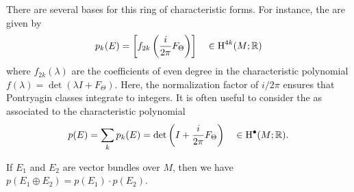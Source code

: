 There are several bases for this ring of characteristic forms. For instance, the  are given by
\[
  p_k(E) = \left[f_{2k}\left(\frac{i}{2\pi}F_\Theta\right)\right]\quad\in\operatorname{H}^{4k}(M; \mathbb{R})
\]
where $f_{2k}(\lambda)$ are the coefficients of even degree in the characteristic polynomial $f(\lambda) = \det(\lambda I+F_\Theta)$. Here, the normalization factor of $i/2\pi$ ensures that Pontryagin classes integrate to integers. It is often useful to consider the  as associated to the characteristic polynomial
\[
  p(E) = \sum_k p_k(E) = \det\left(I + \frac{i}{2\pi} F_\Theta\right) \quad\in \operatorname{H}^\bullet(M; \mathbb{R}).
\]
\begin{proposition} If $E_1$ and $E_2$ are vector bundles over $M$, then we have $p(E_1\oplus E_2) = p(E_1)\cdot p(E_2)$.
\end{proposition}
